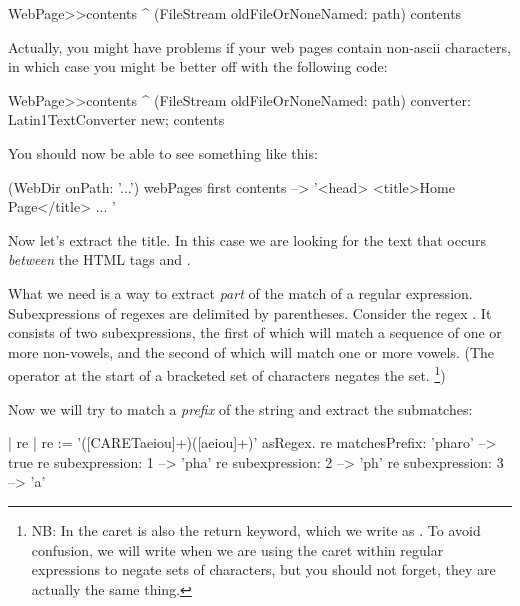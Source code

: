 \documentclass[a4paper,10pt,twoside]{book}
\begin{document}

\begin{code}{}
WebPage>>contents
	^ (FileStream oldFileOrNoneNamed: path) contents
\end{code}

Actually, you might have problems if your web pages contain non-ascii characters, in which case you might be better off with the following code:

\begin{code}{}
WebPage>>contents
	^ (FileStream oldFileOrNoneNamed: path)
		converter: Latin1TextConverter new;
		contents
\end{code}

You should now be able to see something like this:

\begin{code}{}
(WebDir onPath: '...') webPages first contents --> '<head>
<title>Home Page</title>
...
'
\end{code}

Now let's extract the title. In this case we are looking for the text that occurs \emph{between} the HTML tags  and . 

What we need is a way to extract \emph{part} of the match of a regular expression. Subexpressions of regexes are delimited by parentheses. Consider the regex \ct{([CARETaeiou]+)([aeiou]+)}. It consists of two subexpressions, the first of which will match a sequence of one or more non-vowels, and the second of which will match one or more vowels. (The operator  at the start of a bracketed set of characters negates the set. \footnote{NB: In \pharo the caret is also the return keyword, which we write as \ct{^}. To avoid confusion, we will write  when we are using the caret within regular expressions to negate sets of characters, but you should not forget, they are actually the same thing.}) 
  
Now we will try to match a \emph{prefix} of the string  and extract the submatches:

\begin{code}{| re |}
re := '([CARETaeiou]+)([aeiou]+)' asRegex.
re matchesPrefix: 'pharo' --> true
re subexpression: 1         --> 'pha'
re subexpression: 2         --> 'ph'
re subexpression: 3         --> 'a'
\end{code}
\end{document}
